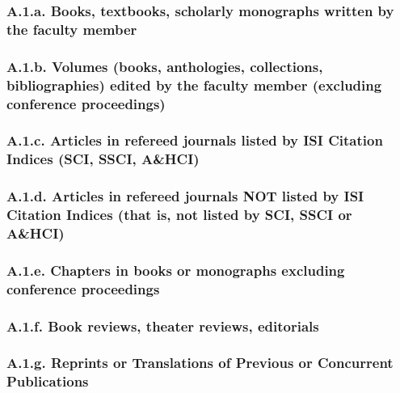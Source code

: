 \documentclass[10pt]{article}
\begin{document}
\subsubsection*{A.1.a. Books, textbooks, scholarly monographs written by the faculty member}



\subsubsection*{A.1.b. Volumes (books, anthologies, collections, bibliographies) edited by the faculty member (excluding conference proceedings)}




\subsubsection*{A.1.c. Articles in refereed journals listed by ISI Citation Indices (SCI, SSCI, A\&HCI)}



\subsubsection*{A.1.d. Articles in refereed journals NOT listed by ISI Citation Indices (that is, not listed by SCI, SSCI or A\&HCI)}



\subsubsection*{A.1.e. Chapters in books or monographs excluding conference proceedings}



\subsubsection*{A.1.f. Book reviews, theater reviews, editorials}




\subsubsection*{A.1.g. Reprints or Translations of Previous or Concurrent Publications}


\end{document}
